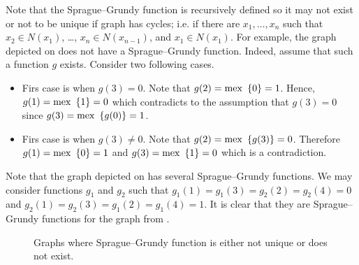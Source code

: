 Note that the Sprague--Grundy function is recursively defined so it may
not exist or not to be unique if graph has cycles; i.e. if there are $x_1,
\dots, x_n$ such that $x_2 \in N(x_1)$, \dots, $x_n \in N(x_{n - 1})$, and 
$x_1 \in N(x_1)$.
For example, the graph depicted on 
does not have a Sprague--Grundy function.
Indeed, assume that such a function $g$ exists. Consider two following cases.
\begin{itemize}
    \item Firs case is when $g(3) = 0$. Note that $g(2) = \mex \set{0} = 1$.
        Hence, $g(1) = \mex \set{1} = 0$ which contradicts to the assumption
        that $g(3) = 0$ since $g(3) = \mex \set{g(0)} = 1$.
    \item Firs case is when $g(3) \neq 0$. Note that $g(2) = \mex \set{g(3)} = 0$.
        Therefore $g(1) = \mex \set{0} = 1$ and $g(3) = \mex \set{1} = 0$ which
        is a contradiction.
\end{itemize}

Note that the graph depicted on  has
several Sprague--Grundy functions. We may consider functions $g_1$ and $g_2$
such that $g_1(1) = g_1(3) = g_2(2) = g_2(4) = 0$ and
$g_2(1) = g_2(3) = g_1(2) = g_1(4) = 1$. It is clear that they are
Sprague--Grundy functions for the graph from
.

\begin{figure}
    \centering
    \qquad
    \caption{Graphs where Sprague--Grundy function is either not unique or does
      not exist.}
    \vskip 10pt
\end{figure}

